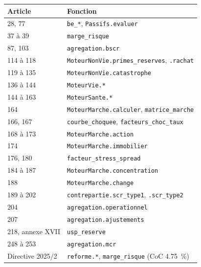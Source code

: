 \documentclass[10pt,a4paper]{article}
\begin{document}
\begin{table}[h]\centering\small
\begin{tabularx}{\linewidth}{lX}
\toprule
\textbf{Article} & \textbf{Fonction}\\
\midrule
28, 77 & \texttt{be\_*}, \texttt{Passifs.evaluer}\\
37 à 39 & \texttt{marge\_risque}\\
87, 103 & \texttt{agregation.bscr}\\
114 à 118 & \texttt{MoteurNonVie.primes\_reserves}, \texttt{.rachat}\\
119 à 135 & \texttt{MoteurNonVie.catastrophe}\\
136 à 144 & \texttt{MoteurVie.*}\\
144 à 163 & \texttt{MoteurSante.*}\\
164 & \texttt{MoteurMarche.calculer}, \texttt{matrice\_marche}\\
166, 167 & \texttt{courbe\_choquee}, \texttt{facteurs\_choc\_taux}\\
168 à 173 & \texttt{MoteurMarche.action}\\
174 & \texttt{MoteurMarche.immobilier}\\
176, 180 & \texttt{facteur\_stress\_spread}\\
184 à 187 & \texttt{MoteurMarche.concentration}\\
188 & \texttt{MoteurMarche.change}\\
189 à 202 & \texttt{contrepartie.scr\_type1}, \texttt{.scr\_type2}\\
204 & \texttt{agregation.operationnel}\\
207 & \texttt{agregation.ajustements}\\
218, annexe XVII & \texttt{usp\_reserve}\\
248 à 253 & \texttt{agregation.mcr}\\
Directive 2025/2 & \texttt{reforme.*}, \texttt{marge\_risque} (CoC \qty{4.75}{\percent})\\
\bottomrule
\end{tabularx}
\end{table}
\end{document}
